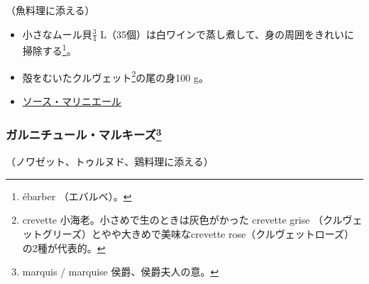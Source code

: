 \begin{recette}

（魚料理に添える）

\begin{itemize}
\item
  小さなムール貝\(\frac{3}{4}\)
  L（35個）は白ワインで蒸し煮して、身の周囲をきれいに掃除する\footnote{ébarber
    （エバルベ）。}。
\item
  殻をむいたクルヴェット\footnote{crevette
    小海老。小さめで生のときは灰色がかった crevette grise
    （クルヴェットグリーズ）とやや大きめで美味なcrevette
    rose（クルヴェットローズ）の2種が代表的。}の尾の身100 g。
\item
  \protect\hyperlink{sauce-mariniere}{ソース・マリニエール}
\end{itemize}

\atoaki{}

\hypertarget{garniture-marquise}{%
\subsubsection[ガルニチュール・マルキーズ]{\texorpdfstring{ガルニチュール・マルキーズ\footnote{marquis
  / marquise 侯爵、侯爵夫人の意。}}{ガルニチュール・マルキーズ}}\label{garniture-marquise}}



（ノワゼット、トゥルヌド、鶏料理に添える）


\end{recette}

